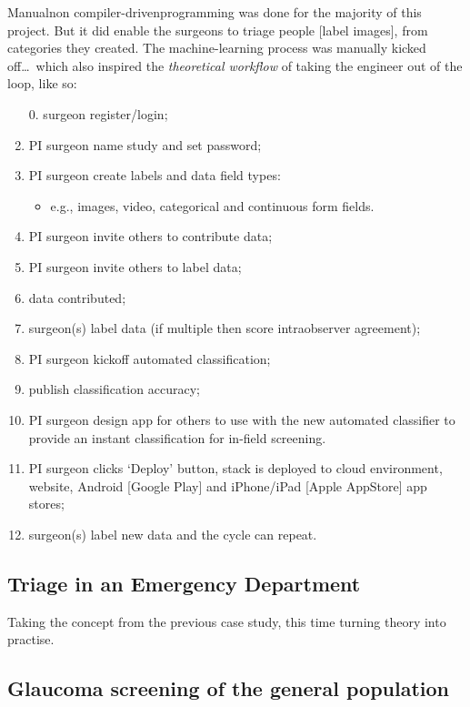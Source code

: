 Manual\textemdash{}non compiler-driven\textemdash{}programming was done for the majority of this project. But it did enable the surgeons to triage people [label images], from categories they created. The machine-learning process was manually kicked off\ldots~which also inspired the \textit{theoretical workflow} of taking the engineer out of the loop, like so:
\begin{enumerate}
    \item[0.] surgeon register/login;
    \item PI surgeon name study and set password;
    \item PI surgeon create labels and data field types:
    \begin{itemize}
        \item e.g., images, video, categorical and continuous form fields.
    \end{itemize}
    \item PI surgeon invite others to contribute data;
    \item PI surgeon invite others to label data;
    \item data contributed;
    \item surgeon(s) label data (if multiple then score intraobserver agreement);
    \item PI surgeon kickoff automated classification;
    \item publish classification accuracy;
    \item PI surgeon design app for others to use with the new automated classifier to provide an instant classification for in-field screening.
    \item PI surgeon clicks `Deploy' button, stack is deployed to cloud environment, website, Android [Google Play] and iPhone/iPad [Apple AppStore] app stores;
    \item surgeon(s) label new data and the cycle can repeat.
\end{enumerate}

\subsection{Triage in an Emergency Department}

Taking the concept from the previous case study, this time turning theory into practise.

\subsection{Glaucoma screening of the general population}

